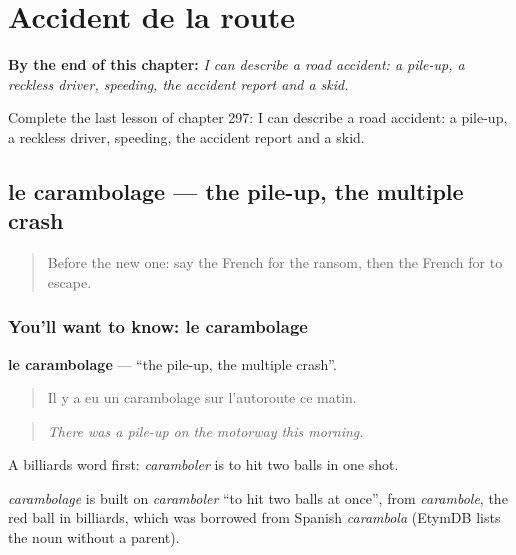 
\chapter{Accident de la route}
\label{ch:fr-accident-de-la-route}

\begin{chapteropening}
\textbf{By the end of this chapter:} \emph{I can describe a road accident: a pile-up, a reckless driver, speeding, the accident report and a skid.}

Complete the last lesson of chapter 297: I can describe a road accident: a pile-up, a reckless driver, speeding, the accident report and a skid.
\end{chapteropening}

\section[le carambolage]{le carambolage — the pile-up, the multiple crash}

\label{lesson:FR-C297-carambolage}



\begin{quote}
Before the new one: say the French for the ransom, then the French for to escape.
\end{quote}

\subsection*{You'll want to know: le carambolage}
\textbf{le carambolage} — \textquotedblleft{}the pile-up, the multiple crash\textquotedblright{}.

\begin{quote}
Il y a eu un carambolage sur l'autoroute ce matin.
\end{quote}

\begin{quote}
\emph{There was a pile-up on the motorway this morning.}
\end{quote}

A billiards word first: \emph{caramboler} is to hit two balls in one shot.

\begin{cousinweb}
\emph{carambolage} is built on \emph{caramboler} \textquotedblleft{}to hit two balls at once\textquotedblright{}, from \emph{carambole}, the red ball in billiards, which was borrowed from Spanish \emph{carambola} (EtymDB lists the noun without a parent).
\end{cousinweb}

